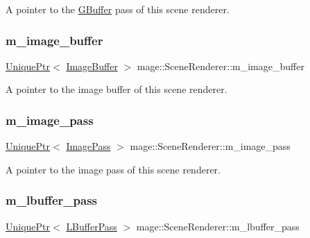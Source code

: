A pointer to the \hyperlink{structmage_1_1_g_buffer}{G\+Buffer} pass of this scene renderer. \hypertarget{classmage_1_1_scene_renderer_aa5a3894d626aa7fec7aa83033b0d01db}{}\label{classmage_1_1_scene_renderer_aa5a3894d626aa7fec7aa83033b0d01db} 
\subsubsection{\texorpdfstring{m\+\_\+image\+\_\+buffer}{m\_image\_buffer}}
{\footnotesize\ttfamily \hyperlink{namespacemage_a3316d7143a973e37adf1110f2e80ca31}{Unique\+Ptr}$<$ \hyperlink{structmage_1_1_image_buffer}{Image\+Buffer} $>$ mage\+::\+Scene\+Renderer\+::m\+\_\+image\+\_\+buffer\hspace{0.3cm}{\ttfamily [private]}}

A pointer to the image buffer of this scene renderer. \hypertarget{classmage_1_1_scene_renderer_aa2f25907375465f0b4693363bc5b7ab5}{}\label{classmage_1_1_scene_renderer_aa2f25907375465f0b4693363bc5b7ab5} 
\subsubsection{\texorpdfstring{m\+\_\+image\+\_\+pass}{m\_image\_pass}}
{\footnotesize\ttfamily \hyperlink{namespacemage_a3316d7143a973e37adf1110f2e80ca31}{Unique\+Ptr}$<$ \hyperlink{classmage_1_1_image_pass}{Image\+Pass} $>$ mage\+::\+Scene\+Renderer\+::m\+\_\+image\+\_\+pass\hspace{0.3cm}{\ttfamily [private]}}

A pointer to the image pass of this scene renderer. \hypertarget{classmage_1_1_scene_renderer_ad4e0f4d858ad1b56a2c948d74ae391eb}{}\label{classmage_1_1_scene_renderer_ad4e0f4d858ad1b56a2c948d74ae391eb} 
\subsubsection{\texorpdfstring{m\+\_\+lbuffer\+\_\+pass}{m\_lbuffer\_pass}}
{\footnotesize\ttfamily \hyperlink{namespacemage_a3316d7143a973e37adf1110f2e80ca31}{Unique\+Ptr}$<$ \hyperlink{structmage_1_1_l_buffer_pass}{L\+Buffer\+Pass} $>$ mage\+::\+Scene\+Renderer\+::m\+\_\+lbuffer\+\_\+pass\hspace{0.3cm}{\ttfamily [private]}}

